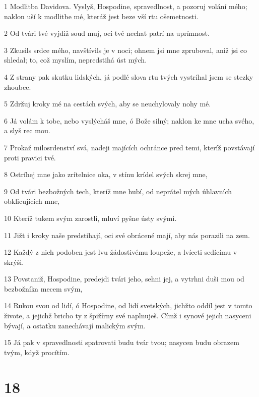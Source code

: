 \par 1 Modlitba Davidova. Vyslyš, Hospodine, spravedlnost, a pozoruj volání mého; naklon uší k modlitbe mé, kteráž jest beze vší rtu ošemetnosti.
\par 2 Od tvári tvé vyjdiž soud muj, oci tvé nechat patrí na uprímnost.
\par 3 Zkusils srdce mého, navštívils je v noci; ohnem jsi mne zpruboval, aniž jsi co shledal; to, což myslím, nepredstihá úst mých.
\par 4 Z strany pak skutku lidských, já podlé slova rtu tvých vystríhal jsem se stezky zhoubce.
\par 5 Zdržuj kroky mé na cestách svých, aby se neuchylovaly nohy mé.
\par 6 Já volám k tobe, nebo vyslýcháš mne, ó Bože silný; naklon ke mne ucha svého, a slyš rec mou.
\par 7 Prokaž milosrdenství svá, nadeji majících ochránce pred temi, kteríž povstávají proti pravici tvé.
\par 8 Ostríhej mne jako zrítelnice oka, v stínu krídel svých skrej mne,
\par 9 Od tvári bezbožných tech, kteríž mne hubí, od neprátel mých úhlavních obklicujících mne,
\par 10 Kteríž tukem svým zarostli, mluví pyšne ústy svými.
\par 11 Jižt i kroky naše predstihají, oci své obrácené mají, aby nás porazili na zem.
\par 12 Každý z nich podoben jest lvu žádostivému loupeže, a lvíceti sedícímu v skrýši.
\par 13 Povstaniž, Hospodine, predejdi tvári jeho, sehni jej, a vytrhni duši mou od bezbožníka mecem svým,
\par 14 Rukou svou od lidí, ó Hospodine, od lidí svetských, jichžto oddíl jest v tomto živote, a jejichž bricho ty z špižírny své naplnuješ. Címž i synové jejich nasyceni bývají, a ostatku zanechávají malickým svým.
\par 15 Já pak v spravedlnosti spatrovati budu tvár tvou; nasycen budu obrazem tvým, když procítím.

\chapter{18}

